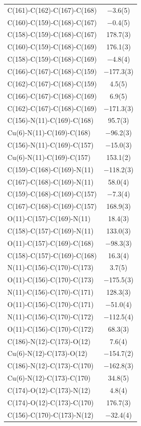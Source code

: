\begin{center}
{\begin{supertabular}{p{1.8in}c}
C(161)-C(162)-C(167)-C(168)&$-$3.6(5)\\
C(160)-C(159)-C(168)-C(167)&$-$0.4(5)\\
C(158)-C(159)-C(168)-C(167)&178.7(3)\\
C(160)-C(159)-C(168)-C(169)&176.1(3)\\
C(158)-C(159)-C(168)-C(169)&$-$4.8(4)\\
C(166)-C(167)-C(168)-C(159)&$-$177.3(3)\\
C(162)-C(167)-C(168)-C(159)&4.5(5)\\
C(166)-C(167)-C(168)-C(169)&6.9(5)\\
C(162)-C(167)-C(168)-C(169)&$-$171.3(3)\\
C(156)-N(11)-C(169)-C(168)&95.7(3)\\
Cu(6)-N(11)-C(169)-C(168)&$-$96.2(3)\\
C(156)-N(11)-C(169)-C(157)&$-$15.0(3)\\
Cu(6)-N(11)-C(169)-C(157)&153.1(2)\\
C(159)-C(168)-C(169)-N(11)&$-$118.2(3)\\
C(167)-C(168)-C(169)-N(11)&58.0(4)\\
C(159)-C(168)-C(169)-C(157)&$-$7.3(4)\\
C(167)-C(168)-C(169)-C(157)&168.9(3)\\
O(11)-C(157)-C(169)-N(11)&18.4(3)\\
C(158)-C(157)-C(169)-N(11)&133.0(3)\\
O(11)-C(157)-C(169)-C(168)&$-$98.3(3)\\
C(158)-C(157)-C(169)-C(168)&16.3(4)\\
N(11)-C(156)-C(170)-C(173)&3.7(5)\\
O(11)-C(156)-C(170)-C(173)&$-$175.5(3)\\
N(11)-C(156)-C(170)-C(171)&128.3(3)\\
O(11)-C(156)-C(170)-C(171)&$-$51.0(4)\\
N(11)-C(156)-C(170)-C(172)&$-$112.5(4)\\
O(11)-C(156)-C(170)-C(172)&68.3(3)\\
C(186)-N(12)-C(173)-O(12)&7.6(4)\\
Cu(6)-N(12)-C(173)-O(12)&$-$154.7(2)\\
C(186)-N(12)-C(173)-C(170)&$-$162.8(3)\\
Cu(6)-N(12)-C(173)-C(170)&34.8(5)\\
C(174)-O(12)-C(173)-N(12)&4.8(4)\\
C(174)-O(12)-C(173)-C(170)&176.7(3)\\
C(156)-C(170)-C(173)-N(12)&$-$32.4(4)\\

\end{supertabular}}
\end{center}
